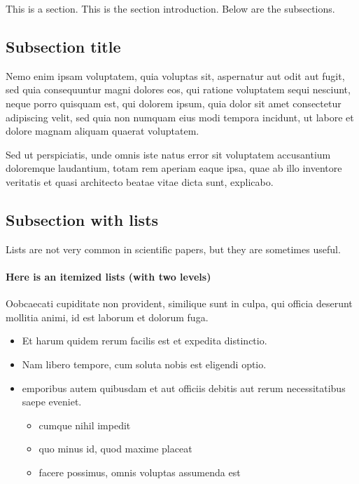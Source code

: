 \documentclass[letterpaper,12pt,leqno]{article}
\begin{document}
This is a section. This is the section introduction. Below are the subsections. 

\subsection{Subsection title}

Nemo enim ipsam voluptatem, quia voluptas sit, aspernatur aut odit aut fugit, sed quia consequuntur magni dolores eos, qui ratione voluptatem sequi nesciunt, neque porro quisquam est, qui dolorem ipsum, quia dolor sit amet consectetur adipiscing velit, sed quia non numquam eius modi tempora incidunt, ut labore et dolore magnam aliquam quaerat voluptatem. 

Sed ut perspiciatis, unde omnis iste natus error sit voluptatem accusantium doloremque laudantium, totam rem aperiam eaque ipsa, quae ab illo inventore veritatis et quasi architecto beatae vitae dicta sunt, explicabo. 

\subsection{Subsection with lists}\label{s:lists}

Lists are not very common in scientific papers, but they are sometimes useful.

\paragraph{Here is an itemized lists (with two levels)} Oobcaecati cupiditate non provident, similique sunt in culpa, qui officia deserunt mollitia animi, id est laborum et dolorum fuga.
\begin{itemize}
\item Et harum quidem rerum facilis est et expedita distinctio.
\item Nam libero tempore, cum soluta nobis est eligendi optio.
\item emporibus autem quibusdam et aut officiis debitis aut rerum necessitatibus saepe eveniet.
\begin{itemize}
	\item cumque nihil impedit
	\item quo minus id, quod maxime placeat
	\item facere possimus, omnis voluptas assumenda est
\end{itemize}
\end{itemize}
\end{document}
